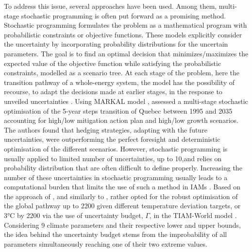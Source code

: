 To address this issue, several approaches have been used. Among them,  multi-stage stochastic programming is often put forward as a promising method. Stochastic programming formulates the problem as a mathematical program with probabilistic constraints or objective functions. These models explicitly consider the uncertainty by incorporating probability distributions for the uncertain parameters. The goal is to find an optimal decision that minimizes/maximizes the expected value of the objective function while satisfying the probabilistic constraints, modelled as a scenario tree.  At each stage of the problem, here the transition pathway of a whole-energy system, the model has the possibility of recourse, \ie to adapt the decisions made at earlier stages, in the response to unveiled uncertainties \cite{grossmann2016recent}. Using MARKAL model \cite{fishbone1981markal}, \citet{kanudia1998robust} assessed a multi-stage stochastic optimisation of the 5-year steps transition of Quebec between 1995 and 2035 accounting for high/low mitigation action plan and high/low growth scenarios. The authors found that hedging strategies, adapting with the future uncertainties, were outperforming the perfect foresight and deterministic optimisation of the different scenarios. However, stochastic programming is usually applied to limited number of uncertainties, \ie up to 10,and relies on probability distribution that are often difficult to define properly. Increasing the number of these uncertainties in stochastic programming usually leads to a computational burden that limits the use of such a method in \gls{IAMs} \cite{nicolas2021robust}. Based on the approach of \citet{bertsimas2004price}, and similarly to \citet{Moret2017PhDThesis}, \citet{nicolas2021robust} rather opted for the robust optimisation of the global pathway up to 2200 given different temperature deviation targets,  or 3°C by 2200 via the use of uncertainty budget, $\Gamma$, in the TIAM-World model \cite{loulou2005documentation}. Considering 9 climate parameters and their respective lower and upper bounds, the idea behind the uncertainty budget stems from the improbability of all parameters simultaneously reaching one of their two extreme values. 

